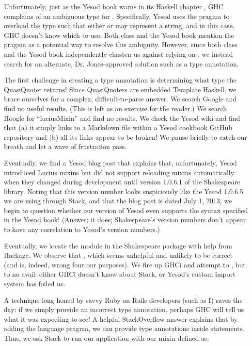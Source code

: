 Unfortunately, just as the Yesod book warns in its Haskell chapter \cite{ybkHaskell}, GHC complains of an ambiguous type for . Specifically, Yesod uses the  pragma to overload the  type such that either  or  may represent a string, and in this case, GHC doesn't know which to use. Both class and the Yesod book mention the  pragma as a potential way to resolve this ambiguity. However, since both class and the Yesod book independently chasten us against relying on , we instead search for an alternate, Dr. Jones-approved solution such as a type annotation.

The first challenge in creating a type annotation is determining what type the QuasiQuoter returns! Since QuasiQuoters are embedded Template Haskell, we brace ourselves for a complex, difficult-to-parse answer. We search Google and find no useful results. (This is left as an exercise for the reader.) We search Hoogle for ``luciusMixin'' and find no results. We check the Yesod wiki \cite{yesodWiki} and find that (a) it simply links to a Markdown file within a Yesod cookbook GitHub repository and (b) all its links appear to be broken! We pause briefly to catch our breath and let a wave of frustration pass.

Eventually, we find a Yesod blog post \cite{yesodBlogShakespeareCSS} that explains that, unfortunately, Yesod introduced Lucius mixins but did not support reloading mixins automatically when they changed during development until version 1.0.6.1 of the Shakespeare library. Noting that this version number looks suspiciously like the Yesod 1.0.6.5 we are using through Stack, and that the blog post is dated July 1, 2013, we begin to question whether our version of Yesod even supports the syntax specified in the Yesod book! (Answer: it does; Shakespeare's version numbers don't appear to have any correlation to Yesod's version numbers.)

Eventually, we locate the  module \cite{apiTextLucius} in the Shakespeare package with help from Hackage. We observe that , which seems unhelpful and unlikely to be correct (and is, indeed, wrong four our purposes). We fire up GHCi and attempt to , but to no avail: either GHCi doesn't know about Stack, or Yesod's custom import system has foiled us.

A technique long honed by savvy Ruby on Rails developers (such as I) saves the day: if we simply provide an incorrect type annotation, perhaps GHC will tell us what it was expecting to see! A helpful StackOverflow answer \cite{soLetTypes} explains that by adding the  language pragma, we can provide type annotations inside  statements. Thus, we ask Stack to run our application with our mixin defined as:

